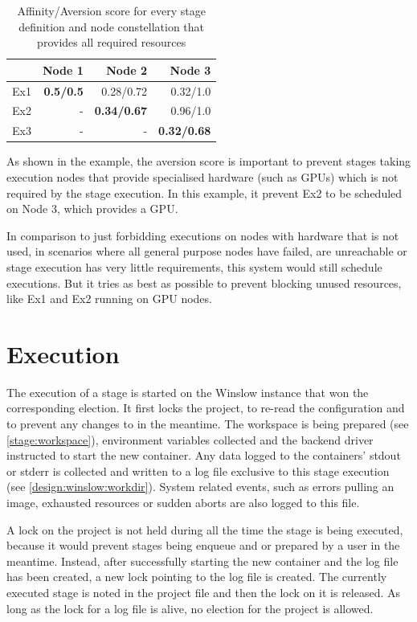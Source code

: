 \begin{table}[H]
	\centering
	\begin{tabular}{l|r|r|r}
		& Node 1 & Node 2 & Node 3 \\
		\hline
		Ex1 & \textbf{0.5/0.5}	& 		  0.28/0.72	& 		  0.32/1.0 \\
		Ex2 & - 				& \textbf{0.34/0.67}& 		  0.96/1.0 \\
		Ex3 & - 				& - 				& \textbf{0.32/0.68} \\
	\end{tabular}
	\caption{Affinity/Aversion score for every stage definition and node constellation that provides all required resources}
\end{table}

As shown in the example, the aversion score is important to prevent stages taking execution nodes that provide specialised hardware (such as GPUs) which is not required by the stage execution.
In this example, it prevent Ex2 to be scheduled on Node 3, which provides a GPU.

In comparison to just forbidding executions on nodes with hardware that is not used, in scenarios where all general purpose nodes have failed, are unreachable or stage execution has very little requirements, this system would still schedule executions.
But it tries as best as possible to prevent blocking unused resources, like Ex1 and Ex2 running on GPU nodes.

\section{Execution}

The execution of a stage is started on the Winslow instance that won the corresponding election.
It first locks the project, to re-read the configuration and to prevent any changes to in the meantime.
The workspace is being prepared (see \autoref{stage:workspace}), environment variables collected and the backend driver instructed to start the new container.
Any data logged to the containers' stdout or stderr is collected and written to a log file exclusive to this stage execution (see \autoref{design:winslow:workdir}).
System related events, such as errors pulling an image, exhausted resources or sudden aborts are also logged to this file.

A lock on the project is not held during all the time the stage is being executed, because it would prevent stages being enqueue and or prepared by a user in the meantime.
Instead, after successfully starting the new container and the log file has been created, a new lock pointing to the log file is created.
The currently executed stage is noted in the project file and then the lock on it is released.
As long as the lock for a log file is alive, no election for the project is allowed.

